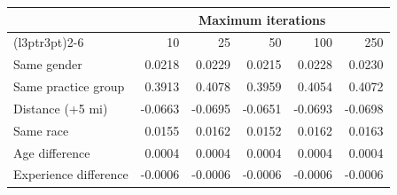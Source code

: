 
\begin{tabular}{lrrrrr}
\toprule
\multicolumn{1}{c}{ } & \multicolumn{5}{c}{Maximum iterations} \\
\cmidrule(l{3pt}r{3pt}){2-6}
 & 10 & 25 & 50 & 100 & 250\\
\midrule
\hspace{1em}Same gender & 0.0218 & 0.0229 & 0.0215 & 0.0228 & 0.0230\\
\hspace{1em}Same practice group & 0.3913 & 0.4078 & 0.3959 & 0.4054 & 0.4072\\
\hspace{1em}Distance (+5 mi) & -0.0663 & -0.0695 & -0.0651 & -0.0693 & -0.0698\\
\hspace{1em}Same race & 0.0155 & 0.0162 & 0.0152 & 0.0162 & 0.0163\\
\hspace{1em}Age difference & 0.0004 & 0.0004 & 0.0004 & 0.0004 & 0.0004\\
\hspace{1em}Experience difference & -0.0006 & -0.0006 & -0.0006 & -0.0006 & -0.0006\\
\bottomrule
\end{tabular}
